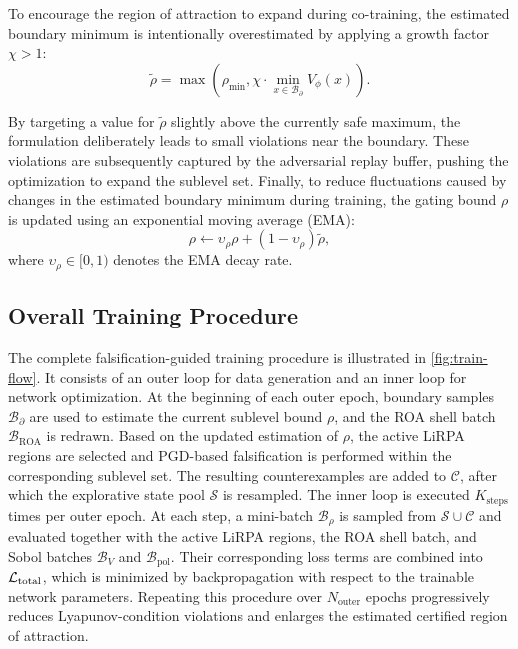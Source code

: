 To encourage the region of attraction to expand during co-training, the estimated boundary minimum is intentionally 
overestimated by applying a growth factor $\chi > 1$:
\begin{equation}
    \label{eq:rho-estimation}
    \tilde{\rho} = \max \left( 
        \rho_{\mathrm{min}}, \chi \cdot \min_{x \in \mathcal{B}_{\partial}} V_\phi(x) 
    \right).
\end{equation}

By targeting a value for $\tilde{\rho}$ slightly above the currently safe maximum, the formulation deliberately 
leads to small violations near the boundary. These violations are subsequently captured by the adversarial replay buffer, 
pushing the optimization to expand the sublevel set. 
Finally, to reduce fluctuations caused by changes in the estimated boundary minimum during training, 
the gating bound $\rho$ is updated using an exponential moving average (EMA):
\begin{equation}
    \label{eq:rho-ema}
    \rho \leftarrow \upsilon_\rho \rho + (1 - \upsilon_\rho) \tilde{\rho},
\end{equation}
where $\upsilon_\rho \in [0, 1)$ denotes the EMA decay rate.



\subsection{Overall Training Procedure}
\label{subsec:training-procedure}

The complete falsification-guided training procedure is illustrated in
\cref{fig:train-flow}. It consists of an outer loop for data generation and an
inner loop for network optimization. 
At the beginning of each outer epoch, boundary samples $\mathcal{B}_{\partial}$ are used to estimate 
the current sublevel bound $\rho$, and the ROA shell batch $\mathcal{B}_{\mathrm{ROA}}$ is redrawn. 
Based on the updated estimation of $\rho$, the active LiRPA regions are selected and PGD-based falsification 
is performed within the corresponding sublevel set. The resulting counterexamples are added to $\mathcal{C}$, 
after which the explorative state pool $\mathcal{S}$ is resampled. 
The inner loop is executed $K_{\mathrm{steps}}$ times per outer epoch. At each step,  
a mini-batch $\mathcal{B}_{\rho}$ is sampled from $\mathcal{S} \cup \mathcal{C}$ and 
evaluated together with the active LiRPA regions, the ROA shell batch, and Sobol batches
$\mathcal{B}_V$ and $\mathcal{B}_{\mathrm{pol}}$. 
Their corresponding loss terms are combined into $\mathcal{L}_{\mathrm{total}}$, which is minimized by
backpropagation with respect to the trainable network parameters. 
Repeating this procedure over $N_{\mathrm{outer}}$ epochs progressively reduces
Lyapunov-condition violations and enlarges the estimated certified region of
attraction.


